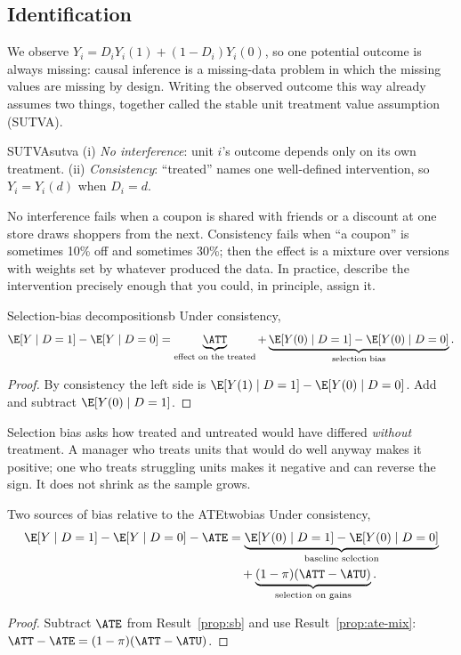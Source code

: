 \documentclass[11pt]{article}
\begin{document}
\subsection{Identification}

We observe $Y_i = D_i Y_i(1) + (1-D_i) Y_i(0)$, so one potential outcome is always missing: causal
inference is a missing-data problem in which the missing values are missing by design. Writing the
observed outcome this way already assumes two things, together called the stable unit treatment value
assumption (SUTVA).

\begin{assum}{SUTVA}{sutva}
(i) \emph{No interference}: unit $i$'s outcome depends only on its own treatment. (ii) \emph{Consistency}:
``treated'' names one well-defined intervention, so $Y_i = Y_i(d)$ when $D_i = d$.
\end{assum}

No interference fails when a coupon is shared with friends or a discount at one store draws shoppers from
the next. Consistency fails when ``a coupon'' is sometimes 10\% off and sometimes 30\%; then
the effect is a mixture over versions with weights set by whatever produced the data. In practice, describe
the intervention precisely enough that you could, in principle, assign it.

\begin{prop}{Selection-bias decomposition}{sb}
Under consistency,
\[
  \E[Y \mid D=1] - \E[Y \mid D=0] = \underbrace{\ATT}_{\text{effect on the treated}}
  + \underbrace{\E[Y(0) \mid D=1] - \E[Y(0) \mid D=0]}_{\text{selection bias}} .
\]
\end{prop}
\begin{proof}
By consistency the left side is $\E[Y(1) \mid D=1] - \E[Y(0) \mid D=0]$. Add and subtract
$\E[Y(0) \mid D=1]$.
\end{proof}

Selection bias asks how treated and untreated would have differed \emph{without} treatment. A manager who
treats units that would do well anyway makes it positive; one who treats struggling units makes it
negative and can reverse the sign. It does not shrink as the sample grows.

\begin{prop}{Two sources of bias relative to the ATE}{twobias}
Under consistency,
\[
\begin{aligned}
  \E[Y \mid D=1] - \E[Y \mid D=0] - \ATE &= \underbrace{\E[Y(0) \mid D=1] - \E[Y(0) \mid D=0]}_{\text{baseline selection}}\\
  &\quad + \underbrace{(1-\pi)(\ATT - \ATU)}_{\text{selection on gains}} .
\end{aligned}
\]
\end{prop}
\begin{proof}
Subtract $\ATE$ from Result~\ref{prop:sb} and use Result~\ref{prop:ate-mix}:
$\ATT - \ATE = (1-\pi)(\ATT - \ATU)$.
\end{proof}
\end{document}
